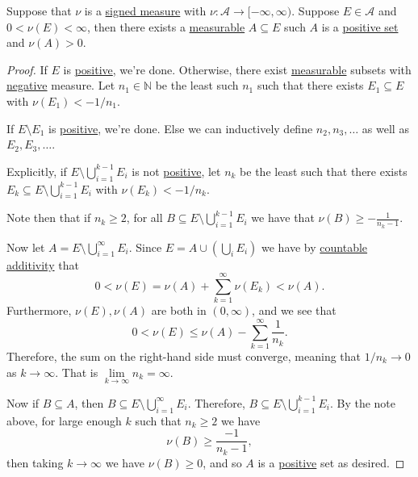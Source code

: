 \begin{lemma}\label{lma:lec28-2}
	Suppose that \(\nu\) is a \hyperref[def:signed-measure]{signed measure} with \(\nu \colon \mathcal{A} \to [-\infty, \infty)\).
	Suppose \(E \in \mathcal{A}\) and \(0 < \nu(E) < \infty\), then there exists a \hyperref[def:measurable-set]{measurable} \(A \subseteq E\)
	such \(A\) is a \hyperref[def:positive-set-for-a-signed-measure]{positive set} and \(\nu(A) > 0\).
\end{lemma}
\begin{proof}
	If \(E\) is \hyperref[def:positive-set-for-a-signed-measure]{positive}, we're done. Otherwise, there exist \hyperref[def:measurable-set]{measurable} subsets with
	\hyperref[def:negative-set-for-a-signed-measure]{negative} measure. Let \(n_1 \in \mathbb{N}\) be the least such \(n_1\) such that there exists
	\(E_1 \subseteq E\) with \(\nu(E_1) < -1/n_1\).

	If \(E \setminus E_1\) is \hyperref[def:positive-set-for-a-signed-measure]{positive}, we're done. Else we can inductively define \(n_2,n_3,\ldots\) as well as \(E_2,E_3,\ldots\).

	Explicitly, if \(E \setminus \bigcup_{i=1}^{k-1} E_i\) is not \hyperref[def:positive-set-for-a-signed-measure]{positive}, let \(n_k\) be the least such that there
	exists \(E_k \subseteq E \setminus \bigcup_{i=1}^{k-1} E_i\) with \(\nu(E_k) < -1/n_k\).

	Note then that if \(n_k \geq 2\), for all \(B \subseteq E \setminus \bigcup_{i=1}^{k-1}E_i\) we have that \(\nu(B) \geq -\frac{1}{n_k - 1}\).

	Now let \(A = E \setminus \bigcup_{i=1}^\infty E_i\). Since \(E = A \cup \left(\bigcup_i E_i\right)\) we have by \hyperref[def:measure-countable-additivity]{countable additivity} that
	\[
		0 < \nu(E) = \nu(A) + \sum_{k=1}^\infty \nu(E_k) < \nu(A).
	\]
	Furthermore, \(\nu(E),\nu(A)\) are both in \((0,\infty)\), and we see that
	\[
		0 < \nu(E) \leq \nu(A) - \sum_{k=1}^\infty \frac{1}{n_k}.
	\]
	Therefore, the sum on the right-hand side must converge, meaning that \(1/n_k \to 0\) as \(k \to \infty\). That is \(\lim\limits_{k \to \infty} n_k = \infty\).

	Now if \(B \subseteq A\), then \(B \subseteq E \setminus \bigcup_{i=1}^\infty E_i\). Therefore, \(B \subseteq  E \setminus \bigcup_{i=1}^{k-1} E_i\). By the note above,
	for large enough \(k\) such that \(n_k \geq 2\) we have
	\[
		\nu(B) \geq \frac{-1}{n_k - 1},
	\]
	then taking \(k \to \infty\) we have \(\nu(B) \geq 0\), and so \(A\) is a \hyperref[def:positive-set-for-a-signed-measure]{positive} set as desired.
\end{proof}

